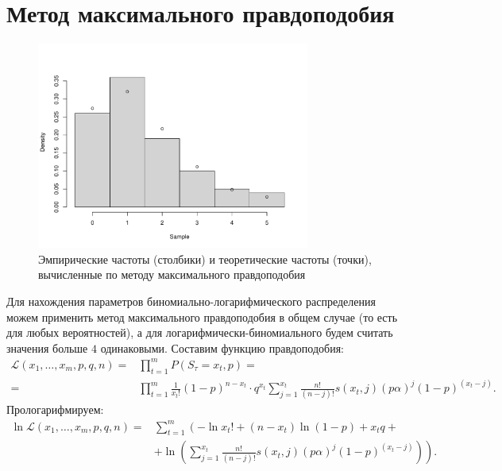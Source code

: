 \documentclass[12pt, specialist, subf, substylefile = spbu.rtx]{disser}
\begin{document}
	\section{Метод максимального правдоподобия}
	
	\label{MMP}
	
	\begin{figure}[ht]
		\centering
		\includegraphics[width = 0.8\textwidth]{binlogexpprob}
		\caption{Эмпирические частоты (столбики) и теоретические частоты (точки), вычисленные по методу максимального правдоподобия}
		\label{img:binlogexpprob}
	\end{figure}
	
	Для нахождения параметров биномиально-логарифмического распределения можем применить метод максимального правдоподобия в общем случае (то есть для любых вероятностей), а для логарифмически-биномиального будем считать значения больше $ 4 $ одинаковыми. Составим функцию правдоподобия:
	\[
		\begin{aligned}
			\mathcal{L} (x _1, \dots, x _m, p, q, n) =& \prod \limits ^m _{t = 1} P(S _\tau = x _t, p) =\\
			=& \prod \limits ^m _{t = 1} \frac 1 {x _t!} (1 - p) ^{n - x _t} \cdot q ^{x _t} \sum \limits ^{x _t} _{j = 1} \frac {n!} {(n - j)!} s(x _t, j) (p \alpha) ^j (1 - p) ^{(x _t - j)}.
		\end{aligned}
	\] 
	Прологарифмируем:
	\[
		\begin{aligned}
			\ln \mathcal{L} (x _1, \dots, x _m, p, q, n) =& \sum \limits ^m _{t = 1} \left( -\ln x _t! + (n - x _t) \ln (1 - p) + x _t q +\right.\\
			&\left.+ \ln \left( \sum \limits ^{x _t} _{j = 1} \frac {n!} {(n - j)!} s(x _t, j) (p \alpha) ^j (1 - p) ^{(x _t - j)} \right) \right).
		\end{aligned}
	\]
	
\end{document}
